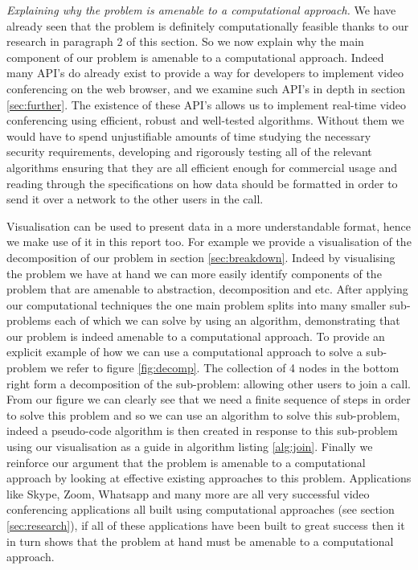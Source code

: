 \textit{Explaining why the problem is amenable to a
computational approach.} We have already seen that the 
problem is definitely computationally feasible thanks to
our research in paragraph 2 of this section. So we now 
explain why the main component of our problem is amenable
to a computational approach. Indeed many API's do already 
exist to provide a way for developers to implement video
conferencing on the web browser, and we examine such API's 
in depth in section \ref{sec:further}. The existence of these 
API's allows us to implement real-time video conferencing
using efficient, robust and well-tested algorithms. Without
them we would have to spend unjustifiable amounts of time 
studying the necessary security requirements, developing and
rigorously testing all of the relevant algorithms ensuring 
that they are all efficient enough for commercial usage and
reading 
through the specifications on how data should be formatted 
in order to send it over a network to the other users in the 
call. \\ \vspace{0.2cm}

Visualisation can be used to present data in a more 
understandable format, hence we make use of it in this report 
too. For example we provide a visualisation of the decomposition
of our problem in section \ref{sec:breakdown}. Indeed by 
visualising the problem we have at hand we can more easily 
identify components of the problem that are amenable to 
abstraction, decomposition and etc. After applying our 
computational techniques the one main problem splits into many
smaller sub-problems each of which we can solve by using an
algorithm, demonstrating that our problem is indeed amenable to 
a computational approach. To provide an explicit example of how 
we can use a computational approach to solve a sub-problem we refer 
to figure \ref{fig:decomp}. The collection of 4 nodes in the
bottom right form a decomposition of the sub-problem: allowing other
users to join a call. From our figure we can clearly see that we
need a finite sequence of steps in order to solve this problem and
so we can use an algorithm to solve this sub-problem, indeed a 
pseudo-code algorithm is then created in response to this sub-problem 
using our visualisation as a guide in algorithm listing \ref{alg:join}.
Finally we reinforce our argument that the problem is amenable to a
computational approach by looking at effective existing 
approaches to this problem. Applications like Skype, Zoom, 
Whatsapp and many more are all very successful video conferencing
applications all built using computational approaches (see
section \ref{sec:research}), if all of these applications
have been 
built to great success then it in turn shows that the problem 
at hand must be amenable to a computational approach.

